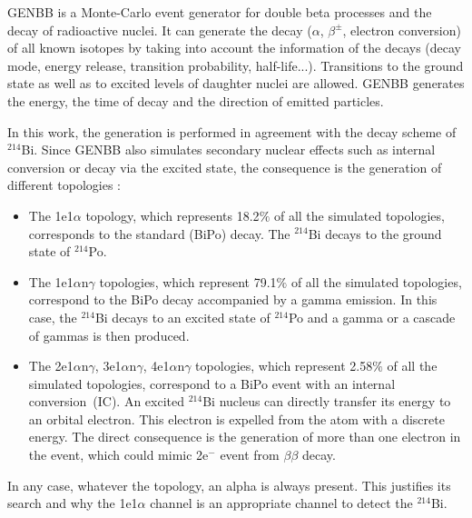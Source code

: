 \documentclass[main.tex]{subfiles}
\begin{document}
\bigskip


\noindent GENBB is a Monte-Carlo event generator for double beta processes and the decay of radioactive nuclei. It can generate the decay ($\alpha$, $\beta^\pm$, electron conversion) of all known isotopes by taking into account the information of the decays (decay mode, energy release, transition probability, half-life...). Transitions to the ground state as well as to excited levels of daughter nuclei are allowed. GENBB generates the energy, the time of decay and the direction of emitted particles.


\bigskip 


\noindent In this work, the generation is performed in agreement with the decay scheme of $^{\text{214}}$Bi. Since GENBB also simulates secondary nuclear effects such as internal conversion or decay via the excited state, the consequence is the generation of different topologies :


\begin{itemize}
\item The 1e1$\alpha$ topology, which represents 18.2$\%$ of all the simulated topologies, corresponds to the standard (BiPo) decay. The $^{\text{214}}$Bi decays to the ground state of $^{\text{214}}$Po.


\item The 1e1$\alpha$n$\gamma$ topologies, which represent 79.1$\%$ of all the simulated topologies, correspond to the BiPo decay accompanied by a gamma emission. In this case, the $^{\text{214}}$Bi decays to an excited state of $^{\text{214}}$Po and a gamma or a cascade of gammas is then produced.


\item The 2e1$\alpha$n$\gamma$, 3e1$\alpha$n$\gamma$, 4e1$\alpha$n$\gamma$ topologies, which represent 2.58$\%$ of all the simulated topologies, correspond to a BiPo event with an internal conversion~(IC). An excited $^{\text{214}}$Bi nucleus can directly transfer its energy to an orbital electron. This electron is expelled from the atom with a discrete energy. The direct consequence is the generation of more than one electron in the event, which could mimic 2e$^-$ event from $\beta\beta$ decay.


\end{itemize}


\noindent In any case, whatever the topology, an alpha is always present. This justifies its search and why the 1e1$\alpha$ channel is an appropriate channel to detect the $^{\text{214}}$Bi.
\end{document}
